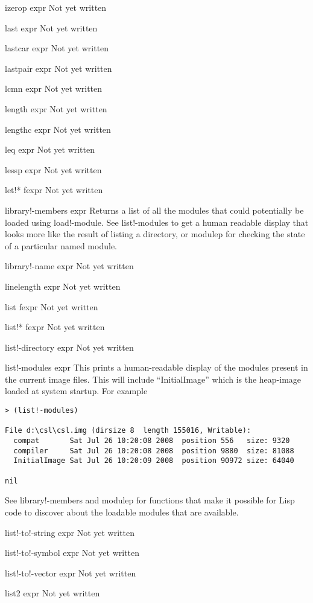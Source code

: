 \documentclass[a4paper,11pt]{article}
\begin{document}
\begin{description}
izerop expr
Not yet written

last expr
Not yet written

lastcar expr
Not yet written

lastpair expr
Not yet written

lcmn expr
Not yet written

length expr
Not yet written

lengthc expr
Not yet written

leq expr
Not yet written

lessp expr
Not yet written

let!* fexpr
Not yet written

library!-members expr
Returns a list of all the modules that could potentially be loaded using
{\ttfamily load!-module}. See {\ttfamily list!-modules} to get a human
readable display that looks more like the result of listing a directory, or
{\ttfamily modulep} for checking the state of a particular named module.
  

library!-name expr
Not yet written

linelength expr
Not yet written

list fexpr
Not yet written

list!* fexpr
Not yet written

list!-directory expr
Not yet written
  

list!-modules expr
This prints a human-readable display of the modules present in the current
image files. This will include ``InitialImage'' which is the heap-image
loaded at system startup. For example
\begin{verbatim}
> (list!-modules)
  
File d:\csl\csl.img (dirsize 8  length 155016, Writable):
  compat       Sat Jul 26 10:20:08 2008  position 556   size: 9320
  compiler     Sat Jul 26 10:20:08 2008  position 9880  size: 81088
  InitialImage Sat Jul 26 10:20:09 2008  position 90972 size: 64040
  
nil
\end{verbatim}
  
See {\ttfamily library!-members} and {\ttfamily modulep} for functions that
make it possible for Lisp code to discover about the loadable modules that are
available.

list!-to!-string expr
Not yet written

list!-to!-symbol expr
Not yet written

list!-to!-vector expr
Not yet written

list2 expr
Not yet written


\end{description}
\end{document}
